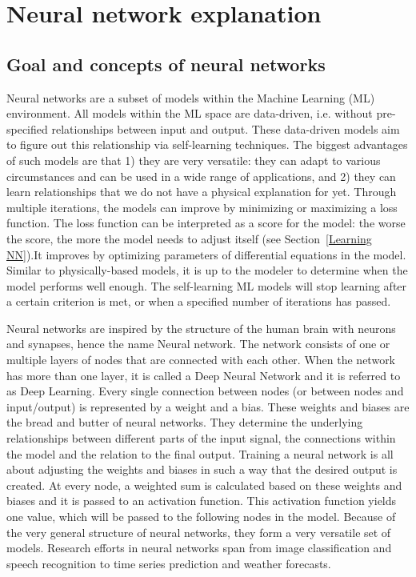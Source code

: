 \documentclass[twocolumn, 10pt, a4paper]{memoir}
\begin{document}
	\section{Neural network explanation} \label{NN explain}
		\subsection{Goal and concepts of neural networks} \label{NNConcepts}
		Neural networks are a subset of models within the Machine Learning (ML) environment. All models within the ML space are data-driven, i.e. without pre-specified relationships between input and output. These data-driven models aim to figure out this relationship via self-learning techniques. 
		The biggest advantages of such models are that 1) they are very versatile: they can adapt to various circumstances and can be used in a wide range of applications, and 2) they can learn relationships that we do not have a physical explanation for yet. Through multiple iterations, the models can improve by minimizing or maximizing a loss function. The loss function can be interpreted as a score for the model: the worse the score, the more the model needs to adjust itself (see Section~\ref{Learning NN}).It improves by optimizing parameters of differential equations in the model. Similar to physically-based models, it is up to the modeler to determine when the model performs well enough. The self-learning ML models will stop learning after a certain criterion is met, or when a specified number of iterations has passed. 
		
		Neural networks are inspired by the structure of the human brain with neurons and synapses, hence the name Neural network. The network consists of one or multiple layers of nodes that are connected with each other. When the network has more than one layer, it is called a Deep Neural Network and it is referred to as Deep Learning. Every single connection between nodes (or between nodes and input/output) is represented by a weight and a bias. These weights and biases are the bread and butter of neural networks. They determine the underlying relationships between different parts of the input signal, the connections within the model and the relation to the final output. Training a neural network is all about adjusting the weights and biases in such a way that the desired output is created. At every node, a weighted sum is calculated based on these weights and biases and it is passed to an activation function. This activation function yields one value, which will be passed to the following nodes in the model. 
		Because of the very general structure of neural networks, they form a very versatile set of models. Research efforts in neural networks span from image classification and speech recognition to time series prediction and weather forecasts. 
		
\end{document}
